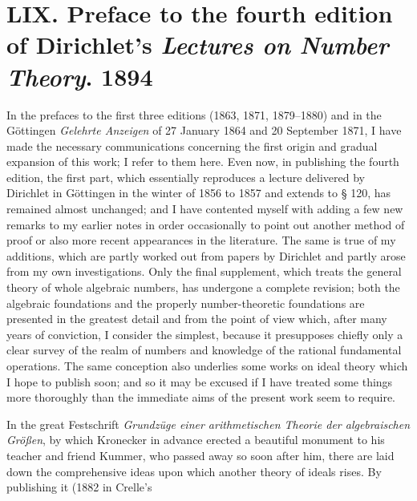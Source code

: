 \documentclass[11pt]{article}
\begin{document}
\section*{LIX. Preface to the fourth edition of Dirichlet's \textit{Lectures on Number Theory}. 1894}

In the prefaces to the first three editions (1863, 1871, 1879--1880) and in the Göttingen \textit{Gelehrte Anzeigen} of 27 January 1864 and 20 September 1871, I have made the necessary communications concerning the first origin and gradual expansion of this work; I refer to them here. Even now, in publishing the fourth edition, the first part, which essentially reproduces a lecture delivered by Dirichlet in Göttingen in the winter of 1856 to 1857 and extends to § 120, has remained almost unchanged; and I have contented myself with adding a few new remarks to my earlier notes in order occasionally to point out another method of proof or also more recent appearances in the literature. The same is true of my additions, which are partly worked out from papers by Dirichlet and partly arose from my own investigations. Only the final supplement, which treats the general theory of whole algebraic numbers, has undergone a complete revision; both the algebraic foundations and the properly number-theoretic foundations are presented in the greatest detail and from the point of view which, after many years of conviction, I consider the simplest, because it presupposes chiefly only a clear survey of the realm of numbers and knowledge of the rational fundamental operations. The same conception also underlies some works on ideal theory which I hope to publish soon; and so it may be excused if I have treated some things more thoroughly than the immediate aims of the present work seem to require.

In the great Festschrift \textit{Grundzüge einer arithmetischen Theorie der algebraischen Größen}, by which Kronecker in advance erected a beautiful monument to his teacher and friend Kummer, who passed away so soon after him, there are laid down the comprehensive ideas upon which another theory of ideals rises. By publishing it (1882 in Crelle's
\end{document}
